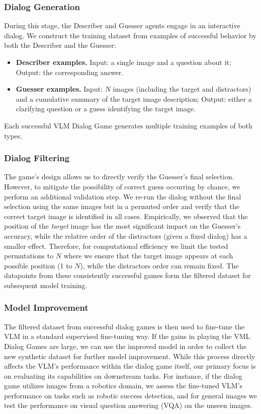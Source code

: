 \subsubsection{Dialog Generation}
During this stage, the Describer and Guesser agents engage in an interactive dialog.
We construct the training dataset from examples of successful behavior by both the Describer and the Guesser:
\begin{itemize}
    \item \textbf{Describer examples.} Input: a single image and a question about it; Output: the corresponding answer.
    \item \textbf{Guesser examples.} Input: $N$ images (including the target and distractors) and a cumulative summary of the target image description; Output: either a clarifying question or a guess identifying the target image.
\end{itemize}
Each successful VLM Dialog Game generates multiple training examples of both types.

\subsubsection{Dialog Filtering}
\label{method-filtering}

The game's design allows us to directly verify the Guesser's final selection.
However, to mitigate the possibility of correct guess occurring by chance, we perform an additional validation step. 
We re-run the dialog without the final selection using the same images but in a permuted order and verify that the correct target image is identified in all cases.
Empirically, we observed that the position of the \textit{target} image has the most significant impact on the Guesser's accuracy, while the relative order of the distractors (given a fixed dialog) has a smaller effect.
Therefore, for computational efficiency we limit the tested permutations to $N$ where we ensure that the target image appears at each possible position (\num{1} to $N$), while the distractors order can remain fixed.
The datapoints from these consistently successful games form the filtered dataset for subsequent model training.

\subsubsection{Model Improvement}

The filtered dataset from successful dialog games is then used to fine-tune the VLM in a standard supervised fine-tuning way.
If the gains in playing the VML Dialog Games are large, we can use the improved model in order to collect the new synthetic dataset for further model improvement.
While this process directly affects the VLM's performance within the dialog game itself, our primary focus is on evaluating its capabilities on downstream tasks.
For instance, if the dialog game utilizes images from a robotics domain, we assess the fine-tuned VLM's performance on tasks such as robotic success detection, and for general images we test the performance on visual question answering (VQA) on the unseen images.